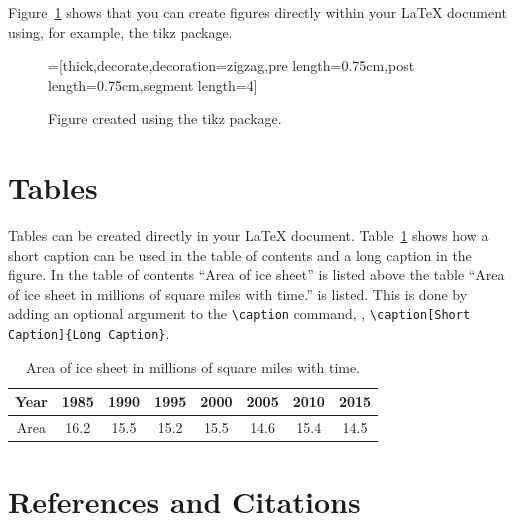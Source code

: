 Figure~\ref{fig:tikz} shows that you can create figures directly within your \LaTeX{} document using, for example, the tikz package.
\begin{figure}[htbp]
  \centering
  =[thick,decorate,decoration={zigzag,pre length=0.75cm,post length=0.75cm,segment length=4}]
  \caption{Figure created using the tikz package.}
  \label{fig:tikz}
\end{figure}


\section{Tables}\label{Sect:tabs}
Tables can be created directly in your \LaTeX{} document.  Table~\ref{tab:ice} shows how a short caption can be used in the table of contents and a long caption in the figure.  In the table of contents ``Area of ice sheet'' is listed above the table ``Area of ice sheet in millions of square miles with time.'' is listed.  This is done by adding an optional argument to the \verb|\caption| command, \ie, \verb|\caption[Short Caption]{Long Caption}|.

\begin{table}[htbp]
  \centering
  \caption[Area of ice sheet]{Area of ice sheet in millions of square miles with time.}
  \label{tab:ice}
  \begin{tabular}{c | ccccccc}
    Year  & 1985 & 1990 & 1995 & 2000 & 2005 & 2010 & 2015\\\hline
    Area  & 16.2 & 15.5   & 15.2  & 15.5  & 14.6 & 15.4 & 14.5 
  \end{tabular}
\end{table}

\section{References and Citations}\label{Sect:ref_cite}

